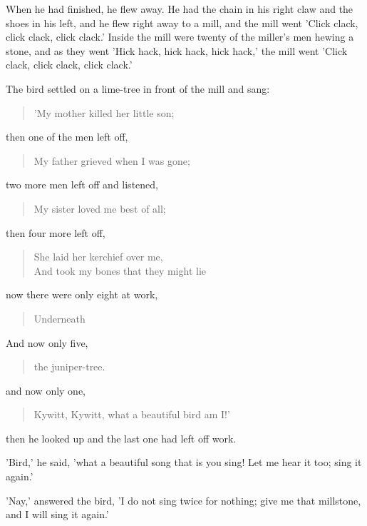\documentclass[12pt]{book}
\begin{document}
When he had finished, he flew away. He had the chain in his right claw
and the shoes in his left, and he flew right away to a mill, and the
mill went 'Click clack, click clack, click clack.' Inside the mill
were twenty of the miller's men hewing a stone, and as they went 'Hick
hack, hick hack, hick hack,' the mill went 'Click clack, click clack,
click clack.'

The bird settled on a lime-tree in front of the mill and sang:

\begin{verse}
 'My mother killed her little son;
\end{verse}

then one of the men left off,

\begin{verse}
  My father grieved when I was gone;
\end{verse}

two more men left off and listened,

\begin{verse}
  My sister loved me best of all;
\end{verse}

then four more left off,

\begin{verse}
  She laid her kerchief over me,\\
  And took my bones that they might lie
\end{verse}

now there were only eight at work,

\begin{verse}
  Underneath
\end{verse}

And now only five,

\begin{verse}
the juniper-tree.
\end{verse}

and now only one,

\begin{verse}
  Kywitt, Kywitt, what a beautiful bird am I!'
\end{verse}

then he looked up and the last one had left off work.

'Bird,' he said, 'what a beautiful song that is you sing! Let me hear
it too; sing it again.'

'Nay,' answered the bird, 'I do not sing twice for nothing; give me
that millstone, and I will sing it again.'
\end{document}
